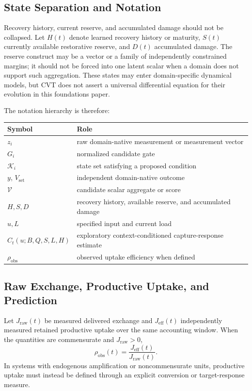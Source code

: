 \documentclass[11pt]{article}
\newcommand{\V}{\mathcal{V}}
\begin{document}
\subsection{State Separation and Notation}

Recovery history, current reserve, and accumulated damage should not be collapsed. Let \(H(t)\) denote learned recovery history or maturity, \(S(t)\) currently available restorative reserve, and \(D(t)\) accumulated damage. The reserve construct may be a vector or a family of independently constrained margins; it should not be forced into one latent scalar when a domain does not support such aggregation. These states may enter domain-specific dynamical models, but CVT does not assert a universal differential equation for their evolution in this foundations paper.

The notation hierarchy is therefore:
\begin{center}
\begin{tabular}{ll}
\toprule
Symbol & Role \\
\midrule
\(z_i\) & raw domain-native measurement or measurement vector \\
\(G_i\) & normalized candidate gate \\
\(\mathcal K_i\) & state set satisfying a proposed condition \\
\(y\), \(V_{\mathrm{set}}\) & independent domain-native outcome \\
\(\V\) & candidate scalar aggregate or score \\
\(H,S,D\) & recovery history, available reserve, and accumulated damage \\
\(u,L\) & specified input and current load \\
\(C_t(u;B,Q,S,L,H)\) & exploratory context-conditioned capture-response estimate \\
\(\rho_{\mathrm{obs}}\) & observed uptake efficiency when defined \\
\bottomrule
\end{tabular}
\end{center}

\subsection{Raw Exchange, Productive Uptake, and Prediction}

Let \(J_{\mathrm{raw}}(t)\) be measured delivered exchange and \(J_{\mathrm{eff}}(t)\) independently measured retained productive uptake over the same accounting window. When the quantities are commensurate and \(J_{\mathrm{raw}}>0\),
\begin{equation}
    \rho_{\mathrm{obs}}(t)
    =
    \frac{J_{\mathrm{eff}}(t)}{J_{\mathrm{raw}}(t)}.
    \label{eq:effective-exchange}
\end{equation}
In systems with endogenous amplification or noncommensurate units, productive uptake must instead be defined through an explicit conversion or target-response measure.
\end{document}
